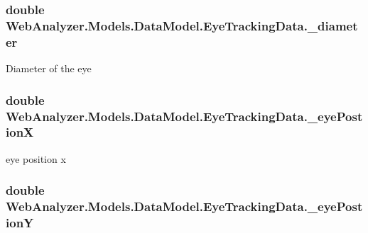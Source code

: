 \subsubsection[{\+\_\+diameter}]{\setlength{\rightskip}{0pt plus 5cm}double Web\+Analyzer.\+Models.\+Data\+Model.\+Eye\+Tracking\+Data.\+\_\+diameter\hspace{0.3cm}{\ttfamily [private]}}\label{class_web_analyzer_1_1_models_1_1_data_model_1_1_eye_tracking_data_a3cdac1c3e4271e126c3310dc4e61ab0b}


Diameter of the eye 

\hypertarget{class_web_analyzer_1_1_models_1_1_data_model_1_1_eye_tracking_data_af659819843df096a6d7cb0a1529dff17}{}
\subsubsection[{\+\_\+eye\+Postion\+X}]{\setlength{\rightskip}{0pt plus 5cm}double Web\+Analyzer.\+Models.\+Data\+Model.\+Eye\+Tracking\+Data.\+\_\+eye\+Postion\+X\hspace{0.3cm}{\ttfamily [private]}}\label{class_web_analyzer_1_1_models_1_1_data_model_1_1_eye_tracking_data_af659819843df096a6d7cb0a1529dff17}


eye position x 

\hypertarget{class_web_analyzer_1_1_models_1_1_data_model_1_1_eye_tracking_data_a6cd742d66dfc6b47af922538b8b9aed1}{}
\subsubsection[{\+\_\+eye\+Postion\+Y}]{\setlength{\rightskip}{0pt plus 5cm}double Web\+Analyzer.\+Models.\+Data\+Model.\+Eye\+Tracking\+Data.\+\_\+eye\+Postion\+Y\hspace{0.3cm}{\ttfamily [private]}}\label{class_web_analyzer_1_1_models_1_1_data_model_1_1_eye_tracking_data_a6cd742d66dfc6b47af922538b8b9aed1}


